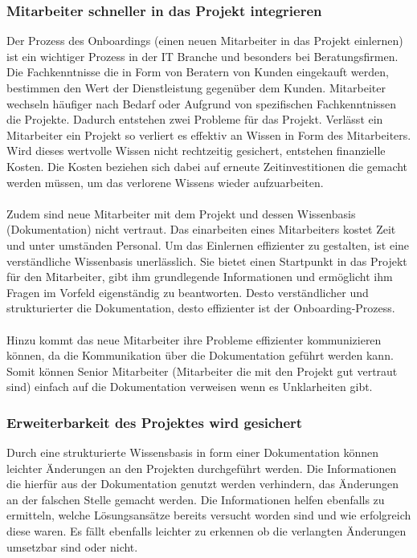\documentclass[a4paper,12pt]{scrartcl}
\begin{document}
\subsubsection{Mitarbeiter schneller in das Projekt integrieren} 
Der Prozess des Onboardings (einen neuen Mitarbeiter in das Projekt einlernen) ist ein wichtiger Prozess in der IT Branche und besonders bei Beratungsfirmen. Die Fachkenntnisse die in Form von Beratern von Kunden eingekauft werden, bestimmen den Wert der Dienstleistung gegenüber dem Kunden. Mitarbeiter wechseln häufiger nach Bedarf oder Aufgrund von spezifischen Fachkenntnissen die Projekte. Dadurch entstehen zwei Probleme für das Projekt. Verlässt ein Mitarbeiter ein Projekt so verliert es effektiv an Wissen in Form des Mitarbeiters. Wird dieses wertvolle Wissen nicht rechtzeitig gesichert, entstehen finanzielle Kosten. Die Kosten beziehen sich dabei auf erneute Zeitinvestitionen die gemacht werden müssen, um das verlorene Wissens wieder aufzuarbeiten.
\\\\
Zudem sind neue Mitarbeiter mit dem Projekt und dessen Wissenbasis (Dokumentation) nicht vertraut. Das einarbeiten eines Mitarbeiters kostet Zeit und unter umständen Personal. Um das Einlernen effizienter zu gestalten, ist eine verständliche Wissenbasis unerlässlich. Sie bietet einen Startpunkt in das Projekt für den Mitarbeiter, gibt ihm grundlegende Informationen und ermöglicht ihm Fragen im Vorfeld eigenständig zu beantworten. Desto verständlicher und strukturierter die Dokumentation, desto effizienter ist der Onboarding-Prozess.   
\\\\
Hinzu kommt das neue Mitarbeiter ihre Probleme effizienter kommunizieren können, da die Kommunikation über die Dokumentation geführt werden kann. Somit können Senior Mitarbeiter (Mitarbeiter die mit den Projekt gut vertraut sind) einfach auf die Dokumentation verweisen wenn es Unklarheiten gibt. 

\subsubsection{Erweiterbarkeit des Projektes wird gesichert}
Durch eine strukturierte Wissensbasis in form einer Dokumentation können leichter Änderungen an den Projekten durchgeführt werden. Die Informationen die hierfür aus der Dokumentation genutzt werden verhindern, das Änderungen an der falschen Stelle gemacht werden. Die Informationen helfen ebenfalls zu ermitteln, welche Lösungsansätze bereits versucht worden sind und wie erfolgreich diese waren. Es fällt ebenfalls leichter zu erkennen ob die verlangten Änderungen umsetzbar sind oder nicht.
\end{document}
